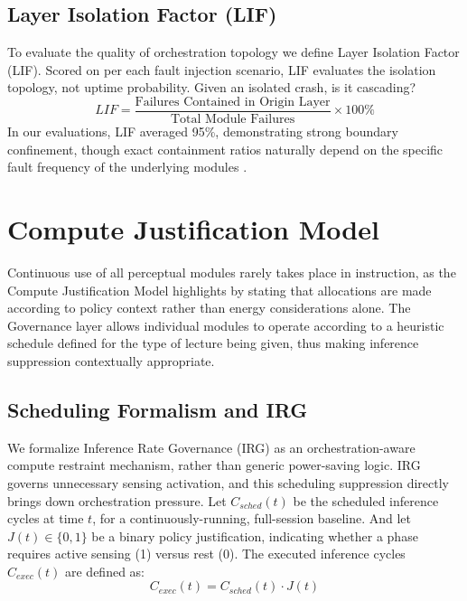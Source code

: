 \documentclass[conference]{IEEEtran}
\begin{document}
\subsection{Layer Isolation Factor (LIF)}
To evaluate the quality of orchestration topology we define Layer Isolation Factor (LIF). Scored on per each fault injection scenario, LIF evaluates the isolation topology, not uptime probability. Given an isolated crash, is it cascading?
\begin{equation}
LIF = \frac{\text{Failures Contained in Origin Layer}}{\text{Total Module Failures}} \times 100\%
\end{equation}
In our evaluations, LIF averaged 95\%, demonstrating strong boundary confinement, though exact containment ratios naturally depend on the specific fault frequency of the underlying modules \cite{b18}.

\section{Compute Justification Model}

Continuous use of all perceptual modules rarely takes place in instruction, as the Compute Justification Model highlights by stating that allocations are made according to policy context rather than energy considerations alone. The Governance layer allows individual modules to operate according to a heuristic schedule defined for the type of lecture being given, thus making inference suppression contextually appropriate.

\subsection{Scheduling Formalism and IRG}
We formalize Inference Rate Governance (IRG) as an orchestration-aware compute restraint mechanism, rather than generic power-saving logic. IRG governs unnecessary sensing activation, and this scheduling suppression directly brings down orchestration pressure. Let $C_{sched}(t)$ be the scheduled inference cycles at time $t$, for a continuously-running, full-session baseline. And let $J(t) \in \{0,1\}$ be a binary policy justification, indicating whether a phase requires active sensing (1) versus rest (0). The executed inference cycles $C_{exec}(t)$ are defined as:
\begin{equation}
C_{exec}(t) = C_{sched}(t) \cdot J(t)
\end{equation}
\end{document}
